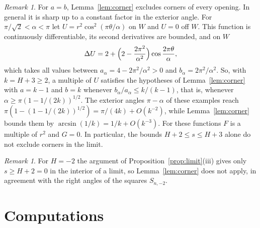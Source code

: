 \documentclass[11pt]{amsart}
\theoremstyle{remark}
\newtheorem{remark}[theorem]{Remark}
\numberwithin{equation}{section}
\begin{document}
\begin{remark}\label{rem:sharp}
For $a=b$, Lemma~\ref{lem:corner} excludes corners of every opening. In general it is sharp up to a constant factor in the exterior angle. For $\pi/\sqrt2<\alpha<\pi$ let $U=r^2\cos^2(\pi\theta/\alpha)$ on $W$ and $U=0$ off $W$. This function is continuously differentiable, its second derivatives are bounded, and on $W$
\[
\Delta U=2+\Bigl(2-\frac{2\pi^2}{\alpha^2}\Bigr)\cos\frac{2\pi\theta}\alpha,
\]
which takes all values between $a_\alpha=4-2\pi^2/\alpha^2>0$ and $b_\alpha=2\pi^2/\alpha^2$. So, with $k=H+3\ge2$, a multiple of $U$ satisfies the hypotheses of Lemma~\ref{lem:corner} with $a=k-1$ and $b=k$ whenever $b_\alpha/a_\alpha\le k/(k-1)$, that is, whenever $\alpha\ge\pi(1-1/(2k))^{1/2}$. The exterior angles $\pi-\alpha$ of these examples reach $\pi(1-(1-1/(2k))^{1/2})=\pi/(4k)+O(k^{-2})$, while Lemma~\ref{lem:corner} bounds them by $\arcsin(1/k)=1/k+O(k^{-3})$. For these functions $F$ is a multiple of $r^2$ and $G=0$. In particular, the bounds $H+2\le s\le H+3$ alone do not exclude corners in the limit.
\end{remark}

\begin{remark}
For $H=-2$ the argument of Proposition~\ref{prop:limit}(iii) gives only $s\ge H+2=0$ in the interior of a limit, so Lemma~\ref{lem:corner} does not apply, in agreement with the right angles of the squares $S_{n,-2}$.
\end{remark}

\section{Computations}\label{sec:checks}
\end{document}
